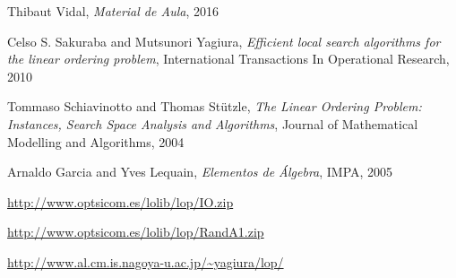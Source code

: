 \documentclass[a4paper,10pt,onecolumn]{article}
\begin{document}
\begin{thebibliography}{99}
 Thibaut Vidal, \emph{Material de Aula}, 2016

 Celso S. Sakuraba and Mutsunori Yagiura,
\emph{Efficient local search algorithms for the linear ordering problem},
International Transactions In Operational Research, 2010

 Tommaso Schiavinotto and Thomas Stützle, \emph{The Linear
Ordering Problem: Instances, Search Space Analysis and Algorithms}, Journal of
Mathematical Modelling and Algorithms, 2004

 Arnaldo Garcia and Yves Lequain, \emph{Elementos de
Álgebra}, IMPA, 2005

\url{http://www.optsicom.es/lolib/lop/IO.zip}

\url{http://www.optsicom.es/lolib/lop/RandA1.zip}

\url{http://www.al.cm.is.nagoya-u.ac.jp/~yagiura/lop/}



\end{thebibliography}
\end{document}
